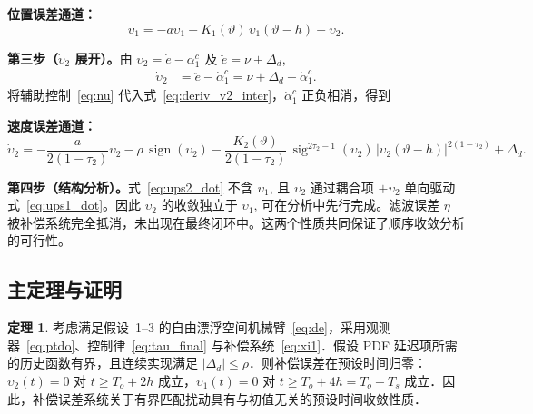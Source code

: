 \documentclass[12pt,a4paper]{article}
\theoremstyle{definition}
\newtheorem{theorem}{定理}[section]
\theoremstyle{remark}
\newcommand{\sign}{\operatorname{sign}}
\newcommand{\sig}{\operatorname{sig}}
\newcommand{\vi}{\upsilon}
\newcommand{\vth}{\vartheta}
\begin{document}
\textbf{位置误差通道：}
\begin{equation}\label{eq:ups1_dot}
  \dot\vi_1=-a\vi_1-K_1(\vth)\,\vi_1(\vth-h)+\vi_2 .
\end{equation}

\noindent\textbf{第三步（$\dot\vi_2$ 展开）。}由 $\vi_2=\dot e-\alpha_1^c$ 及 $\ddot e=\nu+\Delta_d$,
\begin{align}
  \dot\vi_2 &= \ddot e-\dot\alpha_1^c = \nu+\Delta_d-\dot\alpha_1^c . \label{eq:deriv_v2_inter}
\end{align}
将辅助控制~\eqref{eq:nu} 代入式~\eqref{eq:deriv_v2_inter}，$\dot\alpha_1^c$ 正负相消，得到

\textbf{速度误差通道：}
\begin{equation}\label{eq:ups2_dot}
  \dot\vi_2
  =-\frac{a}{2(1-\tau_2)}\vi_2-\rho\,\sign(\vi_2)
   -\frac{K_2(\vth)}{2(1-\tau_2)}\,\sig^{2\tau_2-1}(\vi_2)\,
    \big|\vi_2(\vth-h)\big|^{2(1-\tau_2)}+\Delta_d .
\end{equation}

\noindent\textbf{第四步（结构分析）。}式~\eqref{eq:ups2_dot} 不含 $\vi_1$, 且 $\vi_2$ 通过耦合项 $+\vi_2$ 单向驱动式~\eqref{eq:ups1_dot}。因此 $\vi_2$ 的收敛独立于 $\vi_1$, 可在分析中先行完成。滤波误差 $\eta$ 被补偿系统完全抵消，未出现在最终闭环中。这两个性质共同保证了顺序收敛分析的可行性。

\subsection{主定理与证明}

\begin{theorem}\label{th:1}
考虑满足假设~1--3 的自由漂浮空间机械臂~\eqref{eq:de}，采用观测器~\eqref{eq:ptdo}、控制律~\eqref{eq:tau_final} 与补偿系统~\eqref{eq:xi1}．假设 PDF 延迟项所需的历史函数有界，且连续实现满足 $|\Delta_d|\le\rho$．则补偿误差在预设时间归零：$\vi_2(t)=0$ 对 $t\ge T_o+2h$ 成立，$\vi_1(t)=0$ 对 $t\ge T_o+4h=T_o+T_s$ 成立．因此，补偿误差系统关于有界匹配扰动具有与初值无关的预设时间收敛性质．
\end{theorem}
\end{document}
